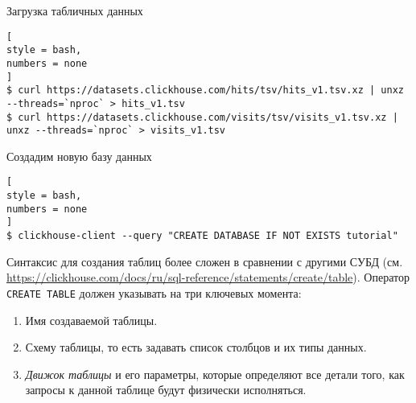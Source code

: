 \documentclass[%
	11pt,
	a4paper,
	utf8,
		]{article}
\begin{document}
Загрузка табличных данных
\begin{lstlisting}[
style = bash,
numbers = none
]
$ curl https://datasets.clickhouse.com/hits/tsv/hits_v1.tsv.xz | unxz --threads=`nproc` > hits_v1.tsv
$ curl https://datasets.clickhouse.com/visits/tsv/visits_v1.tsv.xz | unxz --threads=`nproc` > visits_v1.tsv
\end{lstlisting}

Создадим новую базу данных
\begin{lstlisting}[
style = bash,
numbers = none
]
$ clickhouse-client --query "CREATE DATABASE IF NOT EXISTS tutorial"
\end{lstlisting}

Синтаксис для создания таблиц более сложен в сравнении с другими СУБД (см. \url{https://clickhouse.com/docs/ru/sql-reference/statements/create/table}). Оператор \verb|CREATE TABLE| должен указывать на три ключевых момента:
\begin{enumerate}
	\item Имя создаваемой таблицы.
	
	\item Схему таблицы, то есть задавать список столбцов и их типы данных.
	
	\item \emph{Движок таблицы} и его параметры, которые определяют все детали того, как запросы к данной таблице будут физически исполняться.
\end{enumerate}
\end{document}

